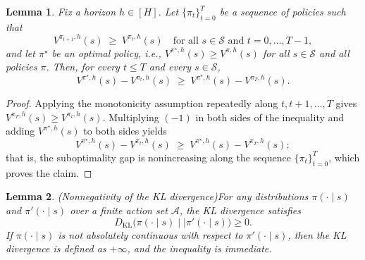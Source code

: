\documentclass[11pt]{article}
\newtheorem{lem}{Lemma}
\begin{document}
\begin{lem}\label{lemma:Vk}
Fix a horizon $h\in[H]$. Let $\{\pi_t\}_{t=0}^{T}$ be a sequence of policies such that
\[
V^{\pi_{t+1},h}(s)\;\ge\;V^{\pi_t,h}(s)\quad\text{for all }s\in\mathcal S\text{ and }t=0,\dots,T-1,
\]
and let $\pi^\star$ be an optimal policy, i.e., $V^{\pi^\star,h}(s)\ge V^{\pi,h}(s)$ for all $s\in\mathcal S$ and all policies $\pi$.
Then, for every $t\le T$ and every $s\in\mathcal S$,
\[
V^{\pi^\star,h}(s)-V^{\pi_t,h}(s)\;\ge\;V^{\pi^\star,h}(s)-V^{\pi_T,h}(s).
\]
\end{lem}
\begin{proof}
Applying the monotonicity assumption repeatedly along $t,t+1,\dots,T$ gives $V^{\pi_T,h}(s)\ge V^{\pi_t,h}(s)$. Multiplying $(-1)$ in both sides of the inequality and adding $V^{\pi^\star,h}(s)$ to both sides yields
\[
V^{\pi^\star,h}(s)-V^{\pi_t,h}(s)\;\ge\;V^{\pi^\star,h}(s)-V^{\pi_T,h}(s);
\]
that is, the suboptimality gap is nonincreasing along the sequence $\{\pi_t\}_{t=0}^{T}$, which proves the claim.
\end{proof}

\begin{lem}{(Nonnegativity of the KL divergence)}\label{lem:KL}
For any distributions $\pi(\cdot\mid s)$ and $\pi'(\cdot\mid s)$ over a finite action set
$\mathcal A$, the KL divergence satisfies
\[
D_{\mathrm{KL}}\big(\pi(\cdot\mid s)\mid\mid\pi'(\cdot\mid s)\big)\ge 0.
\]
If $\pi(\cdot\mid s)$ is not absolutely continuous with respect to $\pi'(\cdot\mid s)$, then
the KL divergence is defined as $+\infty$, and the inequality is immediate.
\end{lem}
\end{document}
